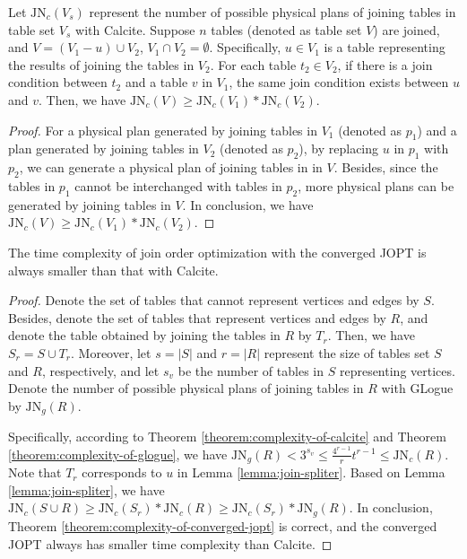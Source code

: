 \begin{lemma}
    \label{lemma:join-spliter}
    Let $\text{JN}_c(V_s)$ represent the number of possible physical plans of joining tables in table set $V_s$ with Calcite.
    Suppose $n$ tables (denoted as table set $V$) are joined, and $V = (V_1 - u) \cup V_2$, $V_1 \cap V_2 = \emptyset$.
    Specifically, $u \in V_1$ is a table representing the results of joining the tables in $V_2$.
    For each table $t_2 \in V_2$, if there is a join condition between $t_2$ and a table $v$ in $V_1$, the same join condition exists between $u$ and $v$.
    Then, we have $\text{JN}_c(V) \geq \text{JN}_c(V_1) * \text{JN}_c(V_2)$.
\end{lemma}
\begin{proof}
    For a physical plan generated by joining tables in $V_1$ (denoted as $p_1$) and a plan generated by joining tables in $V_2$ (denoted as $p_2$), by replacing $u$ in $p_1$ with $p_2$, we can generate a physical plan of joining tables in in $V$.
    Besides, since the tables in $p_1$ cannot be interchanged with tables in $p_2$, more physical plans can be generated by joining tables in $V$.
    In conclusion, we have $\text{JN}_c(V) \geq \text{JN}_c(V_1) * \text{JN}_c(V_2)$.
\end{proof}

\begin{theorem}
    \label{theorem:complexity-of-converged-jopt}
    The time complexity of join order optimization with the converged JOPT is always smaller than that with Calcite.
\end{theorem}
\begin{proof}
    Denote the set of tables that cannot represent vertices and edges by $S$.
    Besides, denote the set of tables that represent vertices and edges by $R$, and denote the table obtained by joining the tables in $R$ by $T_r$.
    Then, we have $S_r = S \cup T_r$.
    Moreover, let $s = |S|$ and $r = |R|$ represent the size of tables set $S$ and $R$, respectively, and let $s_v$ be the number of tables in $S$ representing vertices.
    Denote the number of possible physical plans of joining tables in $R$ with GLogue by $\text{JN}_g(R)$.
    
    Specifically, according to Theorem \ref{theorem:complexity-of-calcite} and Theorem \ref{theorem:complexity-of-glogue}, we have $\text{JN}_g(R) < 3^{s_v} \leq \frac{4^{r-1}}{r}t^{r-1} \leq \text{JN}_c(R)$.
    Note that $T_r$ corresponds to $u$ in Lemma \ref{lemma:join-spliter}.
    Based on Lemma \ref{lemma:join-spliter}, we have $\text{JN}_c(S \cup R) \geq \text{JN}_c(S_r) * \text{JN}_c(R) \geq \text{JN}_c(S_r) * \text{JN}_g(R)$.
    In conclusion, Theorem \ref{theorem:complexity-of-converged-jopt} is correct, and the converged JOPT always has smaller time complexity than Calcite.
\end{proof}

